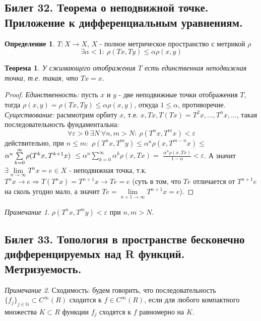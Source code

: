 \documentclass[a4paper]{article}
\theoremstyle{indented}
\newtheorem{theorem}{Теорема}
\theoremstyle{definition}
\newtheorem{defn}{Определение}
\theoremstyle{remark}
\newtheorem{remark}{Примечание}
\begin{document}
\subsection{Билет 32. Теорема о неподвижной точке. Приложение к дифференциальным уравнениям.}


\begin{defn}
     $T: X \to X$, $X$ - полное метрическое пространство с метрикой $\rho$
    $$\exists \alpha < 1: \ \rho(Tx, Ty) \leq \alpha \rho (x,y)$$ 
\end{defn}

\begin{theorem}
    У сжимающего отображения $T$ есть единственная неподвижная точка, т.е. такая, что $Tx=x$. 
\end{theorem}

\begin{proof}
    \textit{Единственность:} пусть $x$ и $y$ - две неподвижные точки отображения $T$, тогда 
    $\rho (x,y) = \rho (T x, T y) \leq \alpha \rho (x,y)$, откуда $1 \leq \alpha$, противоречие. \\
    \textit{Существование:} расммотрим орбиту $x$, т.е. $x, Tx, T(Tx)=T^2 x, ... , T^n x, ...$, такая последовательность фундаментальна:
    $$\forall \varepsilon > 0 \ \exists N \ \forall n,m > N: \ \rho (T^n x, T^m x) < \varepsilon $$
    действительно, при $n \leq m:$ 
    $\rho (T^n x, T^m y) \leq \alpha^n \rho (x, T^{m-n} x) \leq $  
    $\alpha^n \sum\limits_{k=0}^{\infty} \rho (T^k x, T^{k+1} x) \\$ 
    $\leq \alpha^n \sum\limits_{k=0}^{\infty} \alpha^k \rho (x, Tx) = $
    $\frac{\alpha^n \rho (x,Tx)}{1-\alpha}  < \varepsilon$. 
    А значит $\exists \lim\limits_{n \to \infty} T^n x = e \in X$ - неподвижная точка, 
    т.к. $T^n x \to e \Rightarrow T(T^n x) = T^{n+1} x \to Te = e$ (суть в том, что $Te$ отличается от $T^{n+1}e$ на сколь угодно мало,
    а значит $Te = \lim\limits_{n+1 \to \infty} T^{n+1} x = e$).  
\end{proof}

\begin{remark}
    $\rho(T^n x, T^m y) < \varepsilon$ при $n,m>N$.
\end{remark}
\subsection{Билет 33. Топология в пространстве бесконечно дифференцируемых над R функций. Метризуемость.}

\begin{remark}
    Сходимость: будем говорить, что последовательность
    $\{f_j\}_{j\in\mathbb{N}} \subset C^\infty(R)$ сходится к $f \in C^\infty(R)$, 
    если для любого компактного множества $K \subset R$ функции $f_j$
    сходятся к $f$ равномерно на $K$.
\end{remark}
\end{document}
